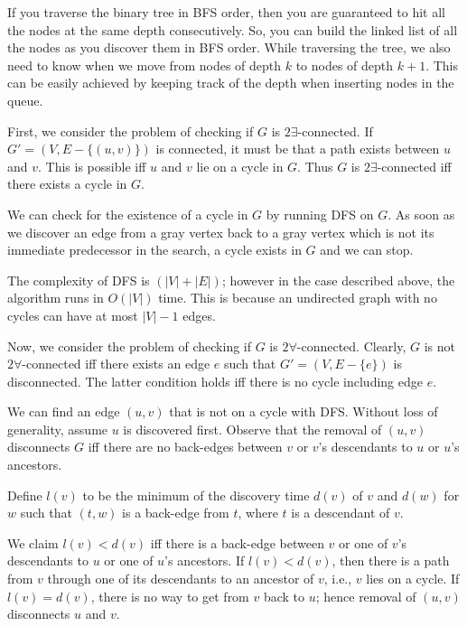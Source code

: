 If you traverse the binary tree in BFS order,
then you are guaranteed to hit all the nodes at the same depth
consecutively. So, you can build the linked list of all the nodes as you
discover them in BFS order. While traversing the tree, we also need to know when we move from
nodes of depth $k$ to nodes of depth $k + 1$. This can be easily
achieved by keeping track of the depth when inserting nodes in
the queue.

First, we consider the problem of checking if 
$G$ is $2\exists$-connected.
If $G' = (V, E- \{(u,v)\})$ is connected, it must be that a path exists between $u$ and $v$.
This is possible iff $u$ and $v$ lie on a cycle in $G$.  Thus $G$ is $2\exists$-connected
iff there exists a cycle in $G$.

We can check for the existence of a cycle in $G$ by running DFS on $G$.  As soon as
we discover an  edge from a gray vertex back to a gray vertex which is not its immediate
predecessor in the search, a cycle exists in $G$ and we can stop.

The complexity of DFS is $(|V| + |E|)$; however in the case described above,
the algorithm runs in $O(|V|)$ time. This is because an undirected
graph with no cycles can have at most $|V|-1$ edges.


Now, we consider the problem of checking if $G$ is $2\forall$-connected.
 Clearly, $G$ is not $2\forall$-connected iff there exists an edge $e$
 such that $G' = (V, E-\{e\})$ is disconnected.
 The latter condition holds iff there is no cycle including edge $e$.

 We can find an edge $(u,v)$ that is not on a cycle with DFS. 
 Without loss of generality, assume $u$ is discovered first.
 Observe that the removal of $(u,v)$ disconnects $G$ iff there are no back-edges
 between $v$ or $v$'s descendants to $u$ or $u$'s ancestors.

 Define $l(v)$ to be the minimum of the discovery time $d(v)$ of $v$ and
 $d(w)$ for $w$ such that $(t,w)$ is a back-edge from $t$, where $t$ is a
 descendant of $v$.

 We claim $l(v) < d(v)$ iff there is a back-edge between $v$ or one of $v$'s descendants 
 to $u$ or one of $u$'s ancestors.
 If $l(v) < d(v)$, then there is a path from $v$ through one of its descendants 
 to an ancestor of $v$, i.e., $v$ lies on a cycle. 
 If $l(v) = d(v)$, there is no way to get from $v$ back to $u$; hence
 removal of $(u,v)$ disconnects $u$ and $v$.

